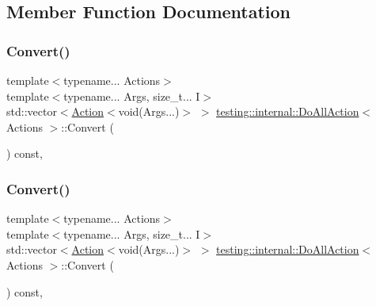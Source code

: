\subsection{Member Function Documentation}
\mbox{\label{structtesting_1_1internal_1_1_do_all_action_a80537babe6f6914feb1083fe655dacc9}} 
\subsubsection{\texorpdfstring{Convert()}{Convert()}\hspace{0.1cm}{\footnotesize\ttfamily [1/2]}}
{\footnotesize\ttfamily template$<$typename... Actions$>$ \\
template$<$typename... Args, size\+\_\+t... I$>$ \\
std\+::vector$<$\mbox{\hyperlink{classtesting_1_1_action}{Action}}$<$void(Args...)$>$ $>$ \mbox{\hyperlink{structtesting_1_1internal_1_1_do_all_action}{testing\+::internal\+::\+Do\+All\+Action}}$<$ Actions $>$\+::Convert (\begin{DoxyParamCaption}\item[{\mbox{\hyperlink{structtesting_1_1internal_1_1_index_sequence}{Index\+Sequence}}$<$ I... $>$}]{ }\end{DoxyParamCaption}) const\hspace{0.3cm}{\ttfamily [inline]}, {\ttfamily [private]}}

\mbox{\label{structtesting_1_1internal_1_1_do_all_action_a80537babe6f6914feb1083fe655dacc9}} 
\subsubsection{\texorpdfstring{Convert()}{Convert()}\hspace{0.1cm}{\footnotesize\ttfamily [2/2]}}
{\footnotesize\ttfamily template$<$typename... Actions$>$ \\
template$<$typename... Args, size\+\_\+t... I$>$ \\
std\+::vector$<$\mbox{\hyperlink{classtesting_1_1_action}{Action}}$<$void(Args...)$>$ $>$ \mbox{\hyperlink{structtesting_1_1internal_1_1_do_all_action}{testing\+::internal\+::\+Do\+All\+Action}}$<$ Actions $>$\+::Convert (\begin{DoxyParamCaption}\item[{\mbox{\hyperlink{structtesting_1_1internal_1_1_index_sequence}{Index\+Sequence}}$<$ I... $>$}]{ }\end{DoxyParamCaption}) const\hspace{0.3cm}{\ttfamily [inline]}, {\ttfamily [private]}}

